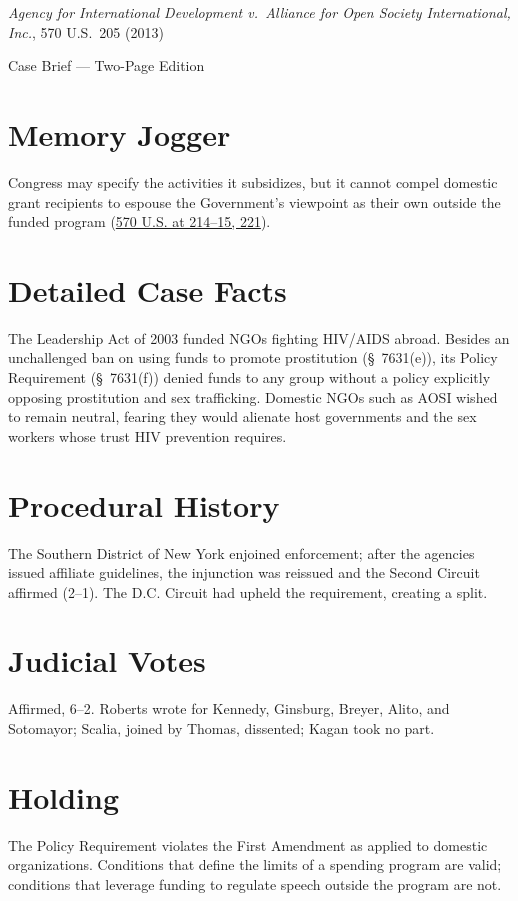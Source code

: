 \documentclass[12pt]{article}
\begin{document}
\begin{center}
{\LARGE \textit{Agency for International Development v.\ Alliance for Open Society International, Inc.}, 570 U.S.\ 205 (2013)\par}
\vspace{0.5em}
{\large Case Brief --- Two-Page Edition\par}
\end{center}

\section{Memory Jogger}
Congress may specify the activities it subsidizes, but it cannot compel domestic grant recipients to espouse the Government's viewpoint as their own outside the funded program (\href{https://supreme.justia.com/cases/federal/us/570/205/}{570 U.S. at 214--15, 221}).

\section{Detailed Case Facts}
The Leadership Act of 2003 funded NGOs fighting HIV/AIDS abroad. Besides an unchallenged ban on using funds to promote prostitution (\S~7631(e)), its Policy Requirement (\S~7631(f)) denied funds to any group without a policy explicitly opposing prostitution and sex trafficking. Domestic NGOs such as AOSI wished to remain neutral, fearing they would alienate host governments and the sex workers whose trust HIV prevention requires.

\section{Procedural History}
The Southern District of New York enjoined enforcement; after the agencies issued affiliate guidelines, the injunction was reissued and the Second Circuit affirmed (2--1). The D.C. Circuit had upheld the requirement, creating a split.

\section{Judicial Votes}
Affirmed, 6--2. Roberts wrote for Kennedy, Ginsburg, Breyer, Alito, and Sotomayor; Scalia, joined by Thomas, dissented; Kagan took no part.

\section{Holding}
The Policy Requirement violates the First Amendment as applied to domestic organizations. Conditions that define the limits of a spending program are valid; conditions that leverage funding to regulate speech outside the program are not.
\end{document}
